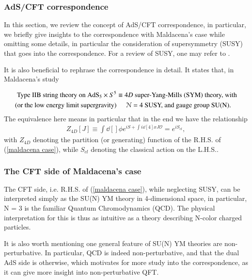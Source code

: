 \documentclass[a4paper, 12pt]{article}
\begin{document}
 


\subsubsection{AdS/CFT correspondence}

In this section, we review the concept of AdS/CFT correspondence, in
particular, we briefly give insights to the correspondence with Maldacena's
case\cite{maldacena1999large} while omitting some details, in particular
the consideration of supersymmetry (SUSY) that goes into the
correspondence. For a review of SUSY, one may refer to
\cite{sohnius1985introducing}. 

It is also beneficial to rephrase the correspondence in detail. It states
that, in Maldacena's study

\begin{align}
  \label{maldacena case}
  \begin{split}
\textnormal{Type IIB string theory on 
  }\mathrm{AdS}_5 \times S^5 &\equiv 4D  \textnormal{  super-Yang-Mills
  (SYM) theory, with} \\
  \textnormal{(or the low energy limit supergravity)}  & \hspace{0.5cm}\mathcal{N} = 4 \textnormal{ SUSY, and gauge group SU(N).
 } 
  \end{split}
\end{align} The equivalence here means in particular that in the end we have
the relationship 
\begin{align}
  \label{ads cft equivalence}
  Z_{4D}[J] \equiv \int \dd[]{\phi} e^{iS + \int i \dd[4]{x}J \mathcal{O}}
  = e^{i S_{cl}},  
\end{align}with \( Z_{4D} \) denoting the partition (or generating)
function of the \textnormal{R.H.S.} of (\ref{maldacena case}), while \(
S_{cl} \) denoting the classical action on the \textnormal{L.H.S.}. 

\subsubsection{The CFT side of Maldacena's case}
 \label{cft side} 
  The CFT side, i.e. \textnormal{R.H.S.} of (\ref{maldacena case}),
  while neglecting SUSY, can be interpreted simply as the SU(N) YM 
  theory in 4-dimensional space, in particular, N = 3 is the
  familiar Quantum Chromodynamics (QCD). The physical
  interpretation for this is thus as intuitive as a theory describing
  N-color charged particles. 

  It is also worth mentioning one general feature of SU(N) YM theories
  are non-perturbative. In particular, QCD is indeed
  non-perturbative, and that the dual AdS side is otherwise, which
  motivates for more study into the correspondence, as it can give more
  insight into non-perturbative QFT. 
\end{document}
